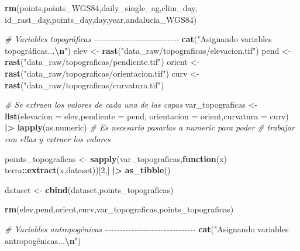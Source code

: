 \documentclass[12pt,a4paper,]{book}
\newenvironment{Shaded}{\begin{snugshade}}{\end{snugshade}}
\newcommand{\AttributeTok}[1]{\textcolor[rgb]{0.13,0.29,0.53}{#1}}
\newcommand{\CommentTok}[1]{\textcolor[rgb]{0.56,0.35,0.01}{\textit{#1}}}
\newcommand{\ControlFlowTok}[1]{\textcolor[rgb]{0.13,0.29,0.53}{\textbf{#1}}}
\newcommand{\DecValTok}[1]{\textcolor[rgb]{0.00,0.00,0.81}{#1}}
\newcommand{\FunctionTok}[1]{\textcolor[rgb]{0.13,0.29,0.53}{\textbf{#1}}}
\newcommand{\NormalTok}[1]{#1}
\newcommand{\OtherTok}[1]{\textcolor[rgb]{0.56,0.35,0.01}{#1}}
\newcommand{\SpecialCharTok}[1]{\textcolor[rgb]{0.81,0.36,0.00}{\textbf{#1}}}
\newcommand{\StringTok}[1]{\textcolor[rgb]{0.31,0.60,0.02}{#1}}
\numberwithin{dummy}{section}
\theoremstyle{ocrenumbox}
\theoremstyle{blacknumex}
\theoremstyle{blacknumbox}
\theoremstyle{ocrenum}
\theoremstyle{ocrenum}
\begin{document}
\begin{Shaded}
\begin{Highlighting}[]
  \FunctionTok{rm}\NormalTok{(points,points\_WGS84,daily\_single\_ag,clim\_day,}
\NormalTok{     id\_rast\_day,points\_day,day,year,andalucia\_WGS84)}
  
  
  \CommentTok{\# Variables topográficas {-}{-}{-}{-}{-}{-}{-}{-}{-}{-}{-}{-}{-}{-}{-}{-}{-}{-}{-}{-}{-}{-}{-}{-}{-}{-}{-}{-}{-}}
  \FunctionTok{cat}\NormalTok{(}\StringTok{"Asignando variables topográficas...}\SpecialCharTok{\textbackslash{}n}\StringTok{"}\NormalTok{)}
\NormalTok{  elev }\OtherTok{\textless{}{-}} \FunctionTok{rast}\NormalTok{(}\StringTok{"data\_raw/topograficas/elevacion.tif"}\NormalTok{)}
\NormalTok{  pend }\OtherTok{\textless{}{-}} \FunctionTok{rast}\NormalTok{(}\StringTok{"data\_raw/topograficas/pendiente.tif"}\NormalTok{)}
\NormalTok{  orient }\OtherTok{\textless{}{-}} \FunctionTok{rast}\NormalTok{(}\StringTok{"data\_raw/topograficas/orientacion.tif"}\NormalTok{)}
\NormalTok{  curv }\OtherTok{\textless{}{-}} \FunctionTok{rast}\NormalTok{(}\StringTok{"data\_raw/topograficas/curvatura.tif"}\NormalTok{)}
  
  \CommentTok{\# Se extraen los valores de cada una de las capas}
\NormalTok{  var\_topograficas }\OtherTok{\textless{}{-}} \FunctionTok{list}\NormalTok{(}\AttributeTok{elevacion =}\NormalTok{ elev,}\AttributeTok{pendiente =}\NormalTok{ pend,}
                           \AttributeTok{orientacion =}\NormalTok{ orient,}\AttributeTok{curvatura =}\NormalTok{ curv) }\SpecialCharTok{|\textgreater{}} 
    \FunctionTok{lapply}\NormalTok{(as.numeric) }\CommentTok{\# Es necesario pasarlas a numeric para poder }
                       \CommentTok{\# trabajar con ellas y extraer los valores}
  
  
\NormalTok{  points\_topograficas }\OtherTok{\textless{}{-}} \FunctionTok{sapply}\NormalTok{(var\_topograficas,}\ControlFlowTok{function}\NormalTok{(x) terra}\SpecialCharTok{::}\FunctionTok{extract}\NormalTok{(x,dataset))[}\DecValTok{2}\NormalTok{,] }\SpecialCharTok{|\textgreater{}} 
    \FunctionTok{as\_tibble}\NormalTok{()}
  
\NormalTok{  dataset }\OtherTok{\textless{}{-}} \FunctionTok{cbind}\NormalTok{(dataset,points\_topograficas)}
  
  \FunctionTok{rm}\NormalTok{(elev,pend,orient,curv,var\_topograficas,points\_topograficas)}
  
  
  \CommentTok{\# Variables antropogénicas {-}{-}{-}{-}{-}{-}{-}{-}{-}{-}{-}{-}{-}{-}{-}{-}{-}{-}{-}{-}{-}{-}{-}{-}{-}{-}{-}{-}{-}{-}{-}}
  \FunctionTok{cat}\NormalTok{(}\StringTok{"Asignando variables antropogénicas...}\SpecialCharTok{\textbackslash{}n}\StringTok{"}\NormalTok{)}
  

\end{Highlighting}
\end{Shaded}
\end{document}
